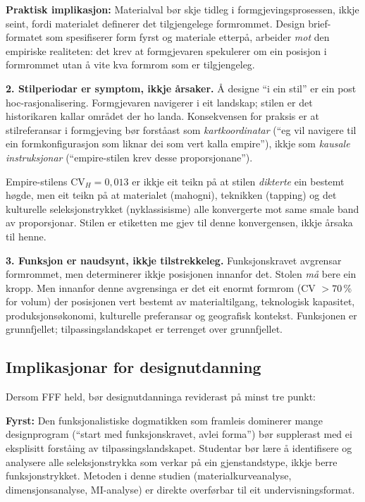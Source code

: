 \documentclass[10pt, a4paper, twocolumn]{article}
\begin{document}
\textbf{Praktisk implikasjon:} Materialval bør skje tidleg i formgjevingsprosessen, ikkje seint, fordi materialet definerer det tilgjengelege formrommet. Design brief-formatet som spesifiserer form fyrst og materiale etterpå, arbeider \emph{mot} den empiriske realiteten: det krev at formgjevaren spekulerer om ein posisjon i formrommet utan å vite kva formrom som er tilgjengeleg.

\textbf{2. Stilperiodar er symptom, ikkje årsaker.} Å designe ``i ein stil'' er ein post hoc-rasjonalisering. Formgjevaren navigerer i eit landskap; stilen er det historikaren kallar området der ho landa. Konsekvensen for praksis er at stilreferansar i formgjeving bør forståast som \emph{kartkoordinatar} (``eg vil navigere til ein formkonfigurasjon som liknar dei som vert kalla empire''), ikkje som \emph{kausale instruksjonar} (``empire-stilen krev desse proporsjonane'').

Empire-stilens $\text{CV}_H = 0{,}013$ er ikkje eit teikn på at stilen \emph{dikterte} ein bestemt høgde, men eit teikn på at materialet (mahogni), teknikken (tapping) og det kulturelle seleksjonstrykket (nyklassisisme) alle konvergerte mot same smale band av proporsjonar. Stilen er etiketten me gjev til denne konvergensen, ikkje årsaka til henne.

\textbf{3. Funksjon er naudsynt, ikkje tilstrekkeleg.} Funksjonskravet avgrensar formrommet, men determinerer ikkje posisjonen innanfor det. Stolen \emph{må} bere ein kropp. Men innanfor denne avgrensinga er det eit enormt formrom (CV $> 70$\,\% for volum) der posisjonen vert bestemt av materialtilgang, teknologisk kapasitet, produksjonsøkonomi, kulturelle preferansar og geografisk kontekst. Funksjonen er grunnfjellet; tilpassingslandskapet er terrenget over grunnfjellet.


\subsection{Implikasjonar for designutdanning}

Dersom FFF held, bør designutdanninga reviderast på minst tre punkt:

\textbf{Fyrst:} Den funksjonalistiske dogmatikken som framleis dominerer mange designprogram (``start med funksjonskravet, avlei forma'') bør supplerast med ei eksplisitt forståing av tilpassingslandskapet. Studentar bør lære å identifisere og analysere alle seleksjonstrykka som verkar på ein gjenstandstype, ikkje berre funksjonstrykket. Metoden i denne studien (materialkurveanalyse, dimensjonsanalyse, MI-analyse) er direkte overførbar til eit undervisningsformat.
\end{document}
